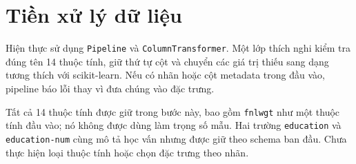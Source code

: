 \section{Tiền xử lý dữ liệu}
\label{sec:4_3}
Hiện thực sử dụng \texttt{Pipeline} và \texttt{ColumnTransformer}. Một lớp thích nghi kiểm tra đúng tên 14 thuộc tính, giữ thứ tự cột và chuyển các giá trị thiếu sang dạng tương thích với scikit-learn. Nếu có nhãn hoặc cột metadata trong đầu vào, pipeline báo lỗi thay vì đưa chúng vào đặc trưng.

Tất cả 14 thuộc tính được giữ trong bước này, bao gồm \texttt{fnlwgt} như một thuộc tính đầu vào; nó không được dùng làm trọng số mẫu. Hai trường \texttt{education} và \texttt{education-num} cùng mô tả học vấn nhưng được giữ theo schema ban đầu. Chưa thực hiện loại thuộc tính hoặc chọn đặc trưng theo nhãn.




